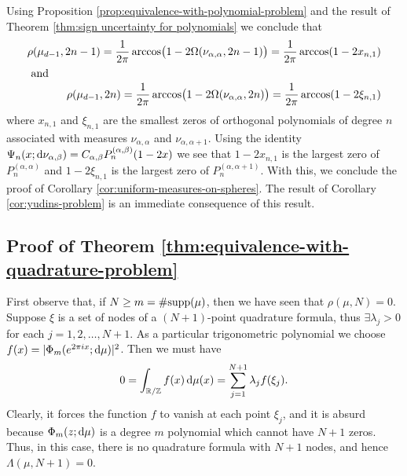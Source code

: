 \documentclass[reqno, a4paper]{amsart}
\def\T{\mathbb{R}/\mathbb{Z}}
\def\supp{{\rm supp}}
\renewcommand{\d}{\text{\rm d}}
\theoremstyle{plain}
\theoremstyle{definition}
\theoremstyle{remarkstyle}
\numberwithin{equation}{section}
\begin{document}
Using Proposition \ref{prop:equivalence-with-polynomial-problem} and the result of Theorem \ref{thm:sign uncertainty for polynomials} we conclude that 
\begin{align*}
    \rho(\mu_{d-1}, 2n-1)=\frac{1}{2\pi}\arccos\bigl(1-2\Omega(\nu_{\alpha, \alpha}, 2n-1)\bigr)=\frac{1}{2\pi}\arccos(1-2 x_{n,1})\\
    \intertext{ and }
    \rho(\mu_{d-1}, 2n)=\frac{1}{2\pi}\arccos\bigl(1-2\Omega(\nu_{\alpha, \alpha}, 2n)\bigr)=\frac{1}{2\pi}\arccos(1-2\xi_{n,1})
\end{align*}
where $x_{n,1}$ and $\xi_{n,1}$ are the smallest zeros of orthogonal polynomials of degree $n$ associated with measures $\nu_{\alpha, \alpha}$ and $\nu_{\alpha, \alpha+1}$. Using the identity $\Psi_{n}(x; \d\nu_{\alpha, \beta})=C_{\alpha, \beta} P_n^{(\alpha, \beta)}(1-2x)$ we see that $1-2x_{n, 1}$ is the largest zero of $P_n^{(\alpha, \alpha)}$ and $1-2\xi_{n,1}$ is the largest zero of $P_n^{(\alpha, \alpha+1)}$. With this, we conclude the proof of Corollary \ref{cor:uniform-measures-on-spheres}. The result of Corollary \ref{cor:yudins-problem} is an immediate consequence of this result.



\subsection{Proof of Theorem \ref{thm:equivalence-with-quadrature-problem}}
First observe that, if $N\geq m=\#\supp(\mu)$, then we have seen that $\rho(\mu, N)=0$. Suppose $\xi$ is a set of nodes of a  $(N+1)$-point quadrature formula, thus $\exists \lambda_{j}>0$ for each $j=1, 2, \ldots, N+1$. As a particular trigonometric polynomial we choose $f(x)=\lvert \Phi_m(e^{2\pi i x}; \d\mu)\rvert^2$. Then we must have 
\begin{equation*}
    0=\int_{\T} f(x)\, \d\mu(x)=\sum_{j=1}^{N+1} \lambda_{j} f(\xi_j).
\end{equation*}
Clearly, it forces the function $f$ to vanish at each point $\xi_j$, and it is absurd because $\Phi_m(z; \d\mu)$ is a degree $m$ polynomial which cannot have $N+1$ zeros. Thus, in this case, there is no quadrature formula with $N+1$ nodes, and hence $\Lambda(\mu, N+1)=0$.

\smallskip
\end{document}
